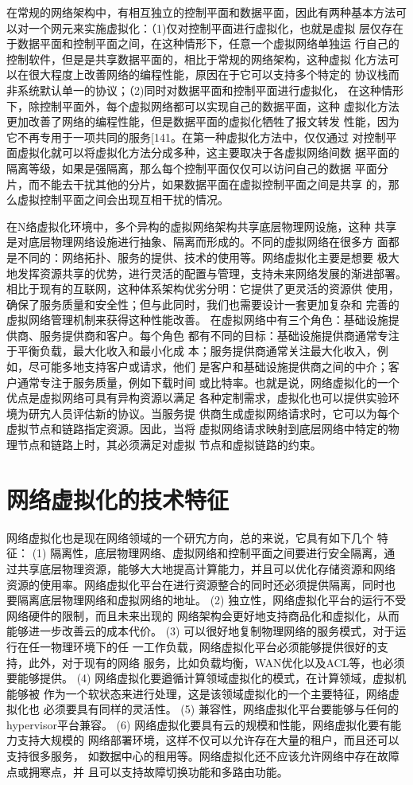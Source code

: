 在常规的网络架构中，有相互独立的控制平面和数据平面，因此有两种基本方法可以对一个网元来实施虚拟化：（1)仅对控制平面进行虚拟化，也就是虚拟 层仅存在于数据平面和控制平面之间，在这种情形下，任意一个虚拟网络单独运 行自己的控制软件，但是是共享数据平面的，相比于常规的网络架构，这种虚拟 化方法可以在很大程度上改善网络的编程性能，原因在于它可以支持多个特定的 协议栈而非系统默认单一的协议；（2)同时对数据平面和控制平面进行虚拟化， 在这种情形下，除控制平面外，每个虚拟网络都可以实现自己的数据平面，这种 虚拟化方法更加改善了网络的编程性能，但是数据平面的虚拟化牺牲了报文转发 性能，因为它不再专用于一项共同的服务[141。在第一种虚拟化方法中，仅仅通过 对控制平面虚拟化就可以将虚拟化方法分成多种，这主要取决于各虚拟网络间数 据平面的隔离等级，如果是强隔离，那么每个控制平面仅仅可以访问自己的数据 平面分片，而不能去干扰其他的分片，如果数据平面在虚拟控制平面之间是共享 的，那么虚拟控制平面之间会出现互相干扰的情况。

在N络虚拟化环境中，多个异构的虚拟网络架构共享底层物理网设施，这种 共享是对底层物理网络设施进行抽象、隔离而形成的。不同的虚拟网络在很多方 面都是不同的：网络拓扑、服务的提供、技术的使用等。网络虚拟化主要是想要 极大地发挥资源共享的优势，进行灵活的配置与管理，支持未来网络发展的渐进部署。相比于现有的互联网，这种体系架构优劣分明：它提供了更灵活的资源供 使用，确保了服务质量和安全性；但与此同时，我们也需要设计一套更加复杂和 完善的虚拟网络管理机制来获得这种性能改善。
在虚拟网络中有三个角色：基础设施提供商、服务提供商和客户。每个角色 都有不同的目标：基础设施提供商通常专注于平衡负载，最大化收入和最小化成 本；服务提供商通常关注最大化收入，例如，尽可能多地支持客户或请求，他们 是客户和基础设施提供商之间的中介；客户通常专注于服务质量，例如下载时间 或比特率。也就是说，网络虚拟化的一个优点是虚拟网络可具有异构资源以满足 各种定制需求，虚拟化也可以提供实验环境为研宄人员评估新的协议。当服务提 供商生成虚拟网络请求时，它可以为每个虚拟节点和链路指定资源。因此，当将 虚拟网络请求映射到底层网络中特定的物理节点和链路上时，其必须满足对虚拟 节点和虚拟链路的约束。

\section{网络虚拟化的技术特征}
网络虚拟化也是现在网络领域的一个研宄方向，总的来说，它具有如下几个 特征：
(1)	隔离性，底层物理网络、虚拟网络和控制平面之间要进行安全隔离，通 过共享底层物理资源，能够大大地提高计算能力，并且可以优化存储资源和网络 资源的使用率。网络虚拟化平台在进行资源整合的同时还必须提供隔离，同时也 要隔离底层物理网络和虚拟网络的地址。
(2)	独立性，网络虚拟化平台的运行不受网络硬件的限制，而且未来出现的 网络架构会更好地支持商品化和虚拟化，从而能够进一步改善云的成本代价。
(3)	可以很好地复制物理网络的服务模式，对于运行在任一物理环境下的任 一工作负载，网络虚拟化平台必须能够提供很好的支持，此外，对于现有的网络 服务，比如负载均衡，WAN优化以及ACL等，也必须要能够提供。
(4)	网络虚拟化要遒循计算领域虚拟化的模式，在计算领域，虚拟机能够被 作为一个软状态来进行处理，这是该领域虚拟化的一个主要特征，网络虚拟化也 必须要具有同样的灵活性。
(5)	兼容性，网络虚拟化平台要能够与任何的hypervisor平台兼容。
(6)	网络虚拟化要具有云的规模和性能，网络虚拟化要有能力支持大规模的 网络部署环境，这样不仅可以允许存在大量的租户，而且还可以支持很多服务， 如数据中心的租用等。网络虚拟化还不应该允许网络中存在故障点或拥寒点，并 且可以支持故障切换功能和多路由功能。

